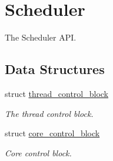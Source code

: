 \hypertarget{group__scheduler}{}\section{Scheduler}
\label{group__scheduler}


The Scheduler A\+PI.  


\subsection*{Data Structures}
\begin{DoxyCompactItemize}
\item 
struct \hyperlink{structthread__control__block}{thread\+\_\+control\+\_\+block}
\begin{DoxyCompactList}\small\item\em The thread control block. \end{DoxyCompactList}\item 
struct \hyperlink{structcore__control__block}{core\+\_\+control\+\_\+block}
\begin{DoxyCompactList}\small\item\em Core control block. \end{DoxyCompactList}\end{DoxyCompactItemize}
